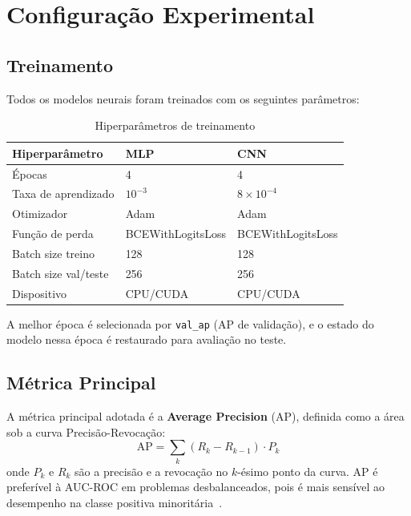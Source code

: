 \documentclass[conference]{IEEEtran}
\begin{document}
\section{Configuração Experimental}

\subsection{Treinamento}

Todos os modelos neurais foram treinados com os seguintes parâmetros:

\begin{table}[H]
\centering
\caption{Hiperparâmetros de treinamento}
\label{tab:hiper}
\footnotesize
\begin{tabularx}{\columnwidth}{lll}
\toprule
\textbf{Hiperparâmetro} & \textbf{MLP} & \textbf{CNN} \\
\midrule
Épocas          & 4 & 4 \\
Taxa de aprendizado & $10^{-3}$ & $8 \times 10^{-4}$ \\
Otimizador      & Adam & Adam \\
Função de perda & BCEWithLogitsLoss & BCEWithLogitsLoss \\
Batch size treino & 128 & 128 \\
Batch size val/teste & 256 & 256 \\
Dispositivo     & CPU/CUDA & CPU/CUDA \\
\bottomrule
\end{tabularx}
\end{table}

A melhor época é selecionada por \texttt{val\_ap} (AP de validação),
e o estado do modelo nessa época é restaurado para avaliação no teste.

\subsection{Métrica Principal}

A métrica principal adotada é a \textbf{Average Precision} (AP), definida
como a área sob a curva Precisão-Revocação:
\begin{equation}
    \mathrm{AP} = \sum_{k} (R_k - R_{k-1}) \cdot P_k
\end{equation}
onde $P_k$ e $R_k$ são a precisão e a revocação no $k$-ésimo ponto da
curva. AP é preferível à AUC-ROC em problemas desbalanceados, pois é
mais sensível ao desempenho na classe positiva minoritária~\cite{davis2006}.
\end{document}
